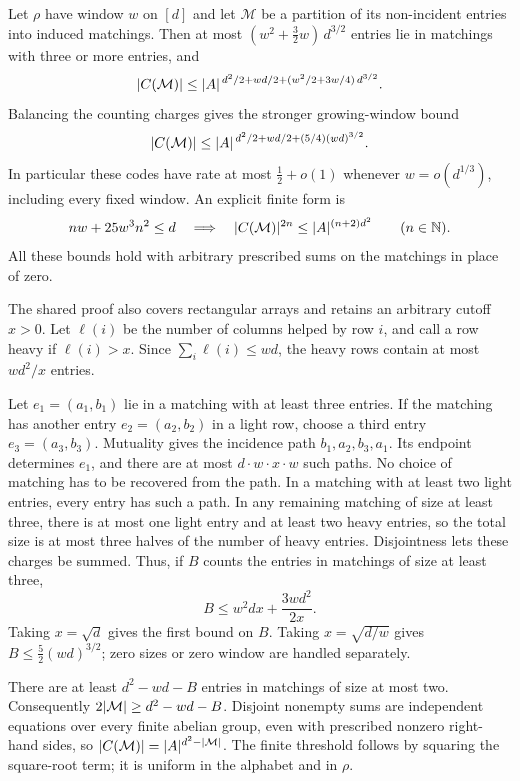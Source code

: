 \begin{proposition}\label{prop:matchings}
Let $\rho$ have window $w$ on $[d]$ and let $\mathcal M$ be a partition of its non-incident entries into induced
matchings. Then at most $(w^2+\tfrac32w)\,d^{3/2}$ entries lie in matchings with three or more entries, and
\[
 \lvert C(\mathcal M) \rvert\le\lvert A \rvert^{\,d^2/2+wd/2+(w^2/2+3w/4)\,d^{3/2}} .
\]
Balancing the counting charges gives the stronger growing-window bound
\[
 \lvert C(\mathcal M) \rvert\le\lvert A \rvert^{\,d^2/2+wd/2+(5/4)(wd)^{3/2}} .
\]
In particular these codes have rate at most $\tfrac12+o(1)$ whenever $w=o(d^{1/3})$, including every fixed window.
An explicit finite form is
\[
 n w+25w^3n^2\le d
 \quad\Longrightarrow\quad
 \lvert C(\mathcal M) \rvert^{2n}\le\lvert A \rvert^{(n+2)d^2}\qquad(n\in\mathbb{N}).
\]
All these bounds hold with arbitrary prescribed sums on the matchings in place of zero.
\end{proposition}
\begin{outline}
The shared proof also covers rectangular arrays and retains an arbitrary cutoff $x>0$. Let $\ell(i)$ be the number of columns helped by row $i$, and call a row heavy if
$\ell(i)>x$. Since $\sum_i\ell(i)\le wd$, the heavy rows contain at most $wd^2/x$ entries.

Let $e_1=(a_1,b_1)$ lie in a matching with at least three entries. If the matching has another entry
$e_2=(a_2,b_2)$ in a light row, choose a third entry $e_3=(a_3,b_3)$. Mutuality gives the incidence path
$b_1,a_2,b_3,a_1$. Its endpoint determines $e_1$, and there are at most $d\cdot w\cdot x\cdot w$ such paths.
No choice of matching has to be recovered from the path. In a matching with at least two light entries, every
entry has such a path. In any remaining matching of size at least three, there is at most one light entry and
at least two heavy entries, so the total size is at most three halves of the number of heavy entries.
Disjointness lets these charges be summed. Thus, if $B$ counts the entries in matchings of size at least three,
\[
 B\le w^2dx+\frac{3wd^2}{2x}.
\]
Taking $x=\sqrt d$ gives the first bound on $B$. Taking $x=\sqrt{d/w}$ gives
$B\le\tfrac52(wd)^{3/2}$; zero sizes or zero window are handled separately.

There are at least $d^2-wd-B$ entries in matchings of size at most two. Consequently
$2\lvert \mathcal M \rvert\ge d^2-wd-B$. Disjoint nonempty sums are independent equations over every finite abelian
group, even with prescribed nonzero right-hand sides, so
$\lvert C(\mathcal M) \rvert=\lvert A \rvert^{d^2-\lvert \mathcal M \rvert}$.
The finite threshold follows by squaring the square-root term; it is uniform in the alphabet and in $\rho$.
\end{outline}

